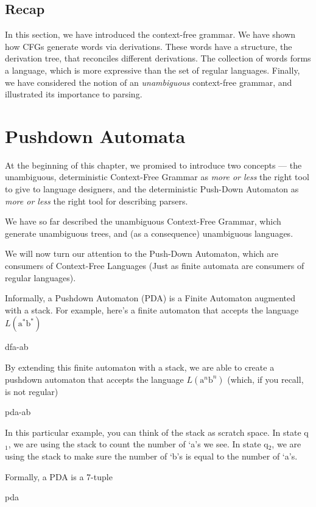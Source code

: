 \subsection{Recap}
In this section, we have introduced the context-free grammar. We have shown how CFGs generate words via derivations. These words have a structure, the derivation tree, that reconciles different derivations. The collection of words forms a language, which is more expressive than the set of regular languages. Finally, we have considered the notion of an \textit{unambiguous} context-free grammar, and illustrated its importance to parsing.

\section{Pushdown Automata}\label{section:pushdownautomata}
At the beginning of this chapter, we promised to introduce two concepts --- the unambiguous, deterministic Context-Free Grammar as \textit{more or less} the right tool to give to language designers, and the deterministic Push-Down Automaton as \textit{more or less} the right tool for describing parsers.

We have so far described the unambiguous Context-Free Grammar, which generate unambiguous trees, and (as a consequence) unambiguous languages. 

We will now turn our attention to the Push-Down Automaton, which are consumers of Context-Free Languages (Just as finite automata are consumers of regular languages). 

Informally, a Pushdown Automaton (PDA) is a Finite Automaton augmented with a stack. For example, here's a finite automaton that accepts the language $L(\text{a}^*\text{b}^*)$
\begin{center}
    {dfa-ab}
\end{center}
By extending this finite automaton with a stack, we are able to create a pushdown automaton that accepts the language $L(\text{a}^n\text{b}^n)$ (which, if you recall, is not regular)
\begin{center}
    {pda-ab}
\end{center}

In this particular example, you can think of the stack as scratch space. In state q$_1$, we are using the stack to count the number of `a's we see. In state q$_2$, we are using the stack to make sure the number of `b's is equal to the number of `a's.

Formally, a PDA is a 7-tuple
\begin{center}
    {pda}
\end{center}


